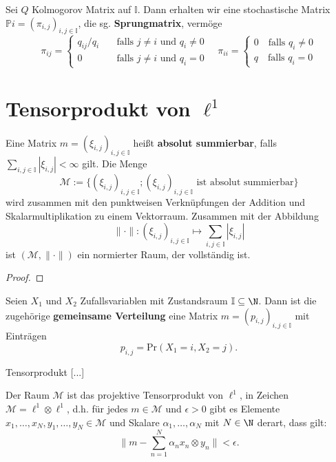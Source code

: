 \begin{konstr}[Sprungmatrix]
  Sei $Q$ Kolmogorov Matrix auf $\mathbb I$. Dann erhalten wir eine stochastische Matrix $\mathbb Pi=(\pi_{i,j})_{i,j\in\mathbb I}$, die sg. \textbf{Sprungmatrix}, vermöge $$\pi_{ij}=\begin{cases} q_{ij}/q_i \quad &\text{falls $j\neq i$ und $q_i\neq 0$}\\
  0\quad &\text{falls $j\neq i$ und $q_i=0$}\end{cases}\quad
  \pi_{ii}=\begin{cases} 0\quad\text{falls $q_i\neq 0$}\\
  q\quad\text{falls $q_i=0$}\end{cases}$$
\end{konstr}




\section{Tensorprodukt von $\ell^1$}

\begin{konstr}
  Eine Matrix $m=(\xi_{i,j})_{i,j\in \mathbb I}$ heißt \textbf{absolut summierbar}, falls $\sum_{i,j\in\mathbb I}|\xi_{i,j}|<\infty$ gilt. Die Menge $$\mathcal M:=\Big\{(\xi_{i,j})_{i,j\in \mathbb I}; (\xi_{i,j})_{i,j\in \mathbb I}\text{ ist absolut summierbar}\Big\}$$wird zusammen mit den punktweisen Verknüpfungen der Addition und Skalarmultiplikation zu einem Vektorraum. Zusammen mit der Abbildung $$\|\cdot\|\colon (\xi_{i,j})_{i,j\in \mathbb I}\mapsto \sum_{i,j\in\mathbb I}|\xi_{i,j}|$$ ist $(\mathcal M,\|\cdot\|)$ ein  normierter Raum, der vollständig ist.
\end{konstr}

\begin{proof}
   
\end{proof}

\begin{defi}
  Seien $X_1$ und $X_2$  Zufallsvariablen mit Zustandsraum $\mathbb I\subseteq \N$. Dann ist die zugehörige \textbf{gemeinsame Verteilung} eine Matrix $m=(p_{i,j})_{i,j\in\mathbb I}$ mit Einträgen $$p_{i,j}=\text{Pr}(X_1=i,X_2=j).$$
\end{defi}

\begin{defi}
  Tensorprodukt [...] 
\end{defi}

\begin{satz}
   Der Raum $\mathcal M$ ist das projektive Tensorprodukt von  $\ell^1$, in Zeichen $\mathcal M=\ell^1\otimes \ell^1$, d.h. für jedes $m\in\mathcal M$ und $\epsilon >0$ gibt es Elemente $x_1,\dots,x_N, y_1,\dots,y_N\in\mathcal M$ und Skalare $\alpha_1,\dots,\alpha_N$ mit $N\in\N$ derart, dass gilt: $$\Bigg\| m-\sum_{n=1}^N \alpha_n x_n\otimes y_n\Bigg\|< \epsilon.$$
\end{satz}

